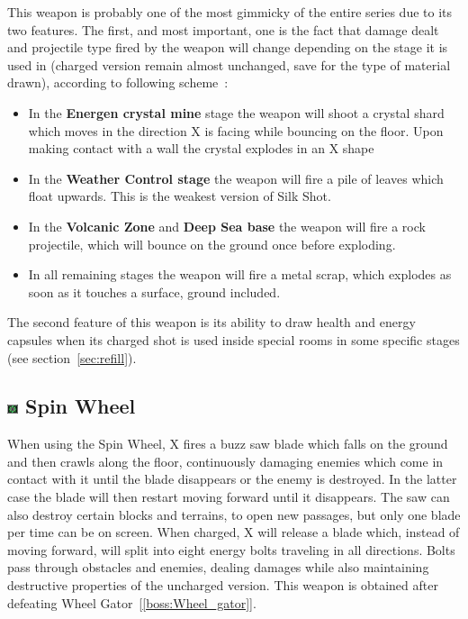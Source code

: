 This weapon is probably one of the most gimmicky of the entire series due to its two features. The first, and most important, one is the fact that damage dealt and projectile type fired by the weapon will change depending on the stage it is used in (charged version remain almost unchanged, save for the type of material drawn), according to following scheme~\cite{wiki:Silk_shot}:
\begin{itemize}
	\item In the \textbf{Energen crystal mine} stage the weapon will shoot a crystal shard which moves in the direction X is facing while bouncing on the floor. Upon making contact with a wall the crystal explodes in an X shape
	\item In the \textbf{Weather Control stage} the weapon will fire a pile of leaves  which float upwards. This is the weakest version of Silk Shot.
	\item In the \textbf{Volcanic Zone} and \textbf{Deep Sea base} the weapon will fire a rock projectile, which will bounce on the ground once before exploding.
	\item In all remaining stages the weapon will fire a metal scrap, which explodes as soon as it touches a surface, ground included.
\end{itemize}

The second feature of this weapon is its ability to draw health and energy capsules when its charged shot is used inside special rooms in some specific stages (see section~\ref{sec:refill}).


\subsection{\includegraphics[width=12px, height=10px]{figures/X2/weapons/S_wheel.png} Spin Wheel}\label{Spinning_wheel}
When using the Spin Wheel, X fires a buzz saw blade which falls on the ground and then crawls along the floor, continuously damaging enemies which come in contact with it until the blade disappears or the enemy is destroyed. In the latter case the blade will then restart moving forward until it disappears. The saw can also destroy certain blocks and terrains, to open new passages, but only one blade per time can be on screen. When charged, X will release a blade which, instead of moving forward, will split into eight energy bolts traveling in all directions. Bolts pass through obstacles and enemies, dealing damages while also maintaining destructive properties of the uncharged version. This weapon is obtained after defeating Wheel Gator~[\ref{boss:Wheel_gator}].

